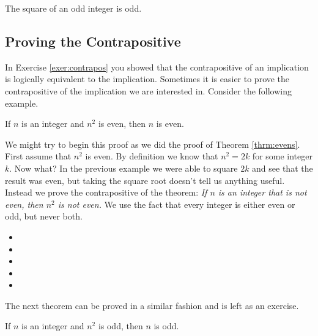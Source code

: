 \begin{thrm}\label{thrm:odds}
The square of an odd integer is odd.
\end{thrm}

\subsection{Proving the Contrapositive}

In Exercise \ref{exer:contrapos} you showed that the contrapositive  of an implication is logically equivalent to the implication.  Sometimes it is easier to prove the contrapositive of the implication we are interested in. Consider the following example.

\begin{thrm}\label{thrm:sqeven}
If $n$ is an integer and $n^2$ is even, then $n$ is even.
\end{thrm}

We might try to begin this proof as we did the proof of Theorem \ref{thrm:evens}.  First assume that $n^2$ is even.  By definition we know that $n^2=2k$ for some integer $k$.  Now what?  In the previous example we were able to square $2k$ and see that the result was even, but taking the square root doesn't tell us anything useful.  Instead we prove the contrapositive of the theorem: \emph{If $n$ is an integer that is not even, then $n^2$ is not even.} We use the fact that every integer is either even or odd, but never both.

\begin{itemize}\itemsep0pt\itemindent-2em
\item[]
\item[]
\item[]
\item[] 
\item[]
\end{itemize}

The next theorem can be proved in a similar fashion and is left as an exercise.

\begin{thrm}\label{thrm:sqodd}
If $n$ is an integer and $n^2$ is odd, then $n$ is odd.
\end{thrm}

